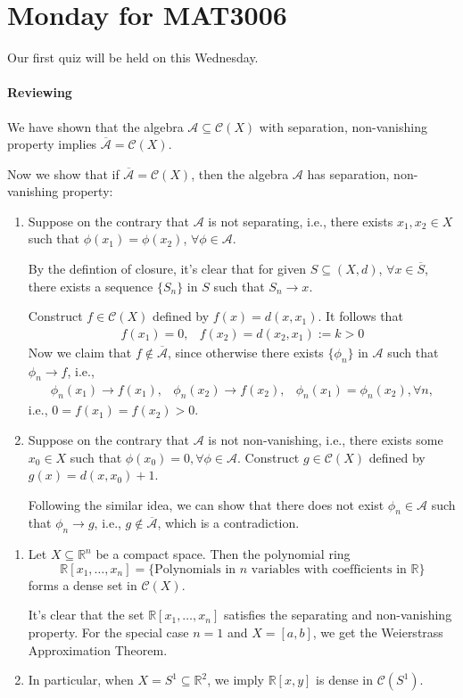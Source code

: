 \section{Monday for MAT3006}
Our first quiz will be held on this Wednesday.

\paragraph{Reviewing}
We have shown that 
the algebra $\mathcal{A}\subseteq\mathcal{C}(X)$ with separation, non-vanishing property 
implies $\overline{\mathcal{A}} = \mathcal{C}(X)$.

Now we show that if $\overline{\mathcal{A}} = \mathcal{C}(X)$, then the algebra $\mathcal{A}$ has separation, non-vanishing property:
\begin{enumerate}
\item
Suppose on the contrary that $\mathcal{A}$ is not separating, i.e., 
there exists $x_1,x_2\in X$ such that $\phi(x_1)=\phi(x_2)$, $\forall\phi\in\mathcal{A}$.

By the defintion of closure, it's clear that for given $S\subseteq(X,d)$, $\forall x\in\overline{S}$, there exists a sequence $\{S_n\}$ in $S$ such that $S_n\to x$.

Construct $f\in\mathcal{C}(X)$ defined by $f(x) = d(x,x_1)$. It follows that
\[
\begin{array}{ll}
f(x_1)=0,
&
f(x_2) = d(x_2,x_1):=k>0
\end{array}
\]
Now we claim that $f\notin\overline{\mathcal{A}}$, since otherwise there exists $\{\phi_n\}$ in $\mathcal{A}$ such that $\phi_n\to f$, i.e.,
\[
\begin{array}{lll}
\phi_n(x_1)\to f(x_1),
&
\phi_n(x_2)\to f(x_2),
&
\phi_n(x_1)=\phi_n(x_2),\forall n,
\end{array}
\]
i.e., $0=f(x_1)=f(x_2)>0$.
\item
Suppose on the contrary that $\mathcal{A}$ is not non-vanishing, i.e., there exists some $x_0\in X$ such that $\phi(x_0)=0,\forall \phi\in\mathcal{A}$. Construct $g\in\mathcal{C}(X)$ defined by $g(x) = d(x,x_0)+1$. 

Following the similar idea, we can show that there does not exist $\phi_n\in\mathcal{A}$ such that $\phi_n\to g$, i.e., $g\notin\overline{\mathcal{A}}$, which is a contradiction.
\end{enumerate}


\begin{example}
\begin{enumerate}
\item
Let $X\subseteq\mathbb{R}^n$ be a compact space. 
Then the polynomial ring 
\[
\mathbb{R}[x_1,\dots,x_n]=\{\text{Polynomials in $n$ variables with coefficients in $\mathbb{R}$}\}
\]
 forms a dense set in $\mathcal{C}(X)$.

It's clear that the set $\mathbb{R}[x_1,\dots,x_n]$ satisfies the separating and non-vanishing property. For the special case $n=1$ and $X=[a,b]$, we get the Weierstrass Approximation Theorem.
\item
In particular, when $X=S^1\subseteq\mathbb{R}^2$, we imply 
$\mathbb{R}[x,y]$ is dense in $\mathcal{C}(S^1)$.
\end{enumerate}
\end{example}
